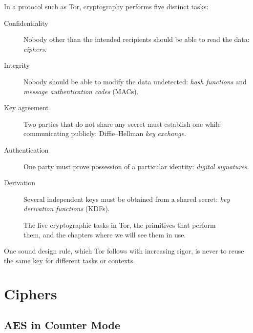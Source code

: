In a protocol such as Tor, cryptography performs five distinct tasks:
\begin{description}
  \item[Confidentiality] Nobody other than the intended recipients should be able to read the data: \emph{ciphers}.
  \item[Integrity] Nobody should be able to modify the data undetected: \emph{hash functions} and \emph{message authentication codes} (MACs).
  \item[Key agreement] Two parties that do not share any secret must establish one while communicating publicly: Diffie--Hellman \emph{key exchange}.
  \item[Authentication] One party must prove possession of a particular identity: \emph{digital signatures}.
  \item[Derivation] Several independent keys must be obtained from a shared secret: \emph{key derivation functions} (KDFs).
\end{description}
\begin{figure}[htbp]
\centering

\caption{The five cryptographic tasks in Tor, the primitives that perform them, and the chapters where we will see them in use.}
\label{fig:compiti}
\end{figure}

One sound design rule, which Tor follows with increasing rigor, is never to reuse the same key for different tasks or contexts.

\section{Ciphers}\label{sec:cripto-cifrari}

\subsection{AES in Counter Mode}

